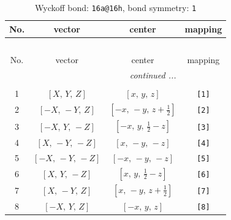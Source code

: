 \documentclass[fleqn,8pt]{jsarticle}
\begin{document}
\begin{longtable}{cccc}
\caption{Wyckoff bond: {\tt 16a@16h}, bond symmetry: {\tt 1}}
 \\
 \hline \hline
No. & vector & center & mapping \\ \hline \endfirsthead

\multicolumn{3}{l}{\tablename\ \thetable{}} \\
 \hline \hline
No. & vector & center & mapping \\ \hline \endhead

 \hline \hline
\multicolumn{3}{r}{\footnotesize\it continued ...} \\ \endfoot

 \hline \hline
\multicolumn{3}{r}{} \\ \endlastfoot

1 & $\left[ X,\, Y,\, Z \right]$ & $\left[ x,\, y,\, z \right]$ & {\tt [1]} \\ \hline
2 & $\left[ - X,\, - Y,\, Z \right]$ & $\left[ - x,\, - y,\, z + \frac{1}{2} \right]$ & {\tt [2]} \\ \hline
3 & $\left[ - X,\, Y,\, - Z \right]$ & $\left[ - x,\, y,\, \frac{1}{2} - z \right]$ & {\tt [3]} \\ \hline
4 & $\left[ X,\, - Y,\, - Z \right]$ & $\left[ x,\, - y,\, - z \right]$ & {\tt [4]} \\ \hline
5 & $\left[ - X,\, - Y,\, - Z \right]$ & $\left[ - x,\, - y,\, - z \right]$ & {\tt [5]} \\ \hline
6 & $\left[ X,\, Y,\, - Z \right]$ & $\left[ x,\, y,\, \frac{1}{2} - z \right]$ & {\tt [6]} \\ \hline
7 & $\left[ X,\, - Y,\, Z \right]$ & $\left[ x,\, - y,\, z + \frac{1}{2} \right]$ & {\tt [7]} \\ \hline
8 & $\left[ - X,\, Y,\, Z \right]$ & $\left[ - x,\, y,\, z \right]$ & {\tt [8]} \\
\end{longtable}
\end{document}
